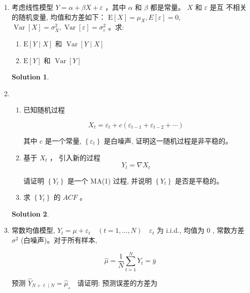 \documentclass[a4paper,UTF8]{article}
\numberwithin{equation}{section}
\newtheorem*{mySol}{Solution}
\begin{document}
\begin{enumerate}
\item 考虑线性模型 $Y=\alpha+\beta X+\varepsilon$ ，其中 $\alpha$ 和 $\beta$ 都是常量。 $X$ 和 $\varepsilon$ 是互 不相关的随机变量, 均值和方差如下： $\mathrm{E}[X]=\mu_{X}, E[\varepsilon]=0$, $\operatorname{Var}[X]=\sigma_{X}^{2}, \operatorname{Var}[\varepsilon]=\sigma_{\varepsilon}^{2}$ 。求:
	\begin{enumerate}[1)]
		\item $\mathrm{E}[Y \mid X]$ 和 $\operatorname{Var}[Y \mid X]$
		\item $\mathrm{E}[Y]$ 和 $\operatorname{Var}[Y]$
	\end{enumerate}

\begin{mySol}
	
	
	
\end{mySol}



\item 	\begin{enumerate}[1)]
		\item 已知随机过程
		
		$$
		X_{t}=\varepsilon_{t}+c\left(\varepsilon_{t-1}+\varepsilon_{t-2}+\cdots\right)
		$$
		
		其中 $\mathrm{c}$ 是一个常量, $\left\{\varepsilon_{t}\right\}$ 是白噪声, 证明这一随机过程是非平稳的。
		\item 基于 $X_{t}$ ， 引入新的过程
		$$
		Y_{t}=\nabla X_{t}
		$$
		
		请证明 $\left\{Y_{t}\right\}$ 是一个 MA(1) 过程, 并说明 $\left\{Y_{t}\right\}$ 是否是平稳的。
		\item 求 $\left\{Y_{t}\right\}$ 的 $A C F$ 。
	\end{enumerate}
 
 
 \begin{mySol}
 	
 	
 	
 \end{mySol}
 
 
 
\item 常数均值模型, $Y_{t}=\mu+\varepsilon_{t} \quad (t=1, \ldots, N) \quad \varepsilon_{t}$ 为 i.i.d., 均值为 0 , 常数方差 $\sigma^{2}$ (白噪声)。对于所有样本, 

$$
\hat{\mu}=\frac{1}{N} \sum_{t=1}^{N} Y_{t}=\bar{y}
$$

预测 $\hat{Y}_{N+\ell \mid N}=\hat{\mu}_{\text {。 }}$ 请证明: 预测误差的方差为


\end{enumerate}
\end{document}
